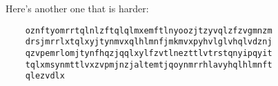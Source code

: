 Here's another one that is harder:
\begin{Verbatim}
    oznftyomrrtqlnlzftqlqlmxemftlnyoozjtzyvqlzfzvgmnzm
    drsjmrrlxtqlxyjtynmvxqlhlmnfjmkmvxpyhvlglvhqlvdznj
    qzvpemrlomjtynfhqzjqqlxylfzvtlnezttlvtrstqnyipqyit
    tqlxmsynmttlvxzvpmjnzjaltemtjqoynmrrhlavyhqlhlmnft
    qlezvdlx
\end{Verbatim}
